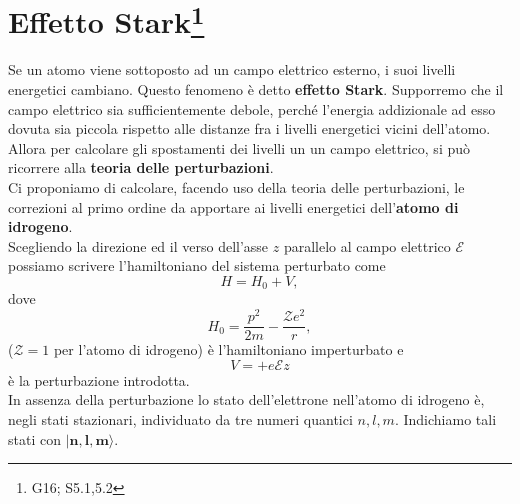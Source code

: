 \documentclass[a4paper,12pt,oneside]{book}
\newcommand*{\myfont}{\fontfamily{ppl}\selectfont}
\begin{document}
\fancypagestyle{plain}{%
\fancyhf{} %
\fancyfoot[C]{\bfseries \myfont{\thepage}} %
\renewcommand{\headrulewidth}{0pt}
\renewcommand{\footrulewidth}{0pt}}

\fancypagestyle{VS}{
\headheight = 15pt
\lhead[\myfont{\textit{\textbf{\thechapter\nouppercase{\leftmark}}}}]{\myfont{\textit{\textbf{\nouppercase{\leftmark}}}}}
\chead[]{}
\rhead[\myfont{\textbf{\thepage}}]{\myfont{\textbf{\thepage}}}

\lfoot[]{}
\cfoot[]{}
\rfoot[]{}
}



\pagestyle{VS}
\setcounter{chapter}{22}
\setcounter{page}{227}
\chapter[Effetto Stark]{Effetto Stark\footnote{G16; S5.1,5.2}}
Se un atomo viene sottoposto ad un campo elettrico esterno, i suoi livelli energetici cambiano. Questo fenomeno è detto \textbf{effetto Stark}.
Supporremo che il campo elettrico sia sufficientemente debole, perché l'energia addizionale ad esso dovuta sia piccola rispetto alle distanze fra i livelli energetici vicini dell'atomo. Allora per calcolare gli spostamenti dei livelli un un campo elettrico, si può ricorrere alla \textbf{teoria delle perturbazioni}.\\
Ci proponiamo di calcolare, facendo uso della teoria delle perturbazioni, le correzioni al primo ordine da apportare ai livelli energetici dell'\textbf{atomo di idrogeno}.\\
Scegliendo la direzione ed il verso dell'asse $z$ parallelo al campo elettrico $\mathcal{E}$ possiamo scrivere l'hamiltoniano del sistema perturbato come
\begin{equation}
H=H_0+V, 
\end{equation}
dove
\begin{equation}
H_0=\frac{p^2}{2m}-\frac{\mathcal{Z}e^2}{r},
\end{equation}
($\mathcal{Z}=1$ per l'atomo di idrogeno) è l'hamiltoniano imperturbato e
\begin{equation}
V=+e\mathcal{E}z
\end{equation}
è la perturbazione introdotta.\\
In assenza della perturbazione lo stato dell'elettrone nell'atomo di idrogeno è, negli stati stazionari, individuato da tre numeri quantici $n,l,m$. Indichiamo tali stati con $\boldsymbol{|n,l,m\rangle}$.
\end{document}
